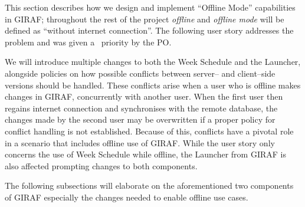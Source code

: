 This section describes how we design and implement \enquote{Offline Mode} capabilities in GIRAF; throughout the rest of the project \textit{offline} and \textit{offline mode} will be defined as \enquote{without internet connection}.
The following user story addresses the problem and was given a \phigh~priority by the PO.

\begin{center}
\end{center}

We will introduce multiple changes to both the Week Schedule and the Launcher, alongside policies on how possible conflicts between server-- and client--side versions should be handled.
These conflicts arise when a user who is offline makes changes in GIRAF, concurrently with another user.
When the first user then regains internet connection and synchronises with the remote database, the changes made by the second user may be overwritten if a proper policy for conflict handling is not established.
Because of this, conflicts have a pivotal role in a scenario that includes offline use of GIRAF.
While the user story only concerns the use of Week Schedule while offline, the Launcher from GIRAF is also affected prompting changes to both components.

The following subsections will elaborate on the aforementioned two components of GIRAF especially the changes needed to enable offline use cases.